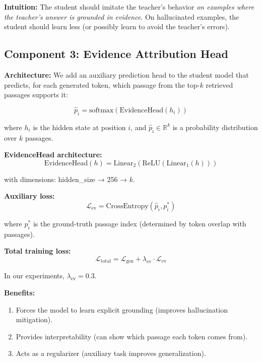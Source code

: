 \documentclass[11pt,a4paper]{article}
\begin{document}
\textbf{Intuition:} The student should imitate the teacher's behavior \textit{on examples where the teacher's answer is grounded in evidence}. On hallucinated examples, the student should learn less (or possibly learn to avoid the teacher's errors).

\subsection{Component 3: Evidence Attribution Head}
\label{sec:evidence}

\textbf{Architecture:} We add an auxiliary prediction head to the student model that predicts, for each generated token, which passage from the top-$k$ retrieved passages supports it:

\begin{equation}
\hat{p}_i = \text{softmax}(\text{EvidenceHead}(h_i))
\end{equation}

where $h_i$ is the hidden state at position $i$, and $\hat{p}_i \in \mathbb{R}^{k}$ is a probability distribution over $k$ passages.

\textbf{EvidenceHead architecture:}
\begin{equation}
\text{EvidenceHead}(h) = \text{Linear}_2(\text{ReLU}(\text{Linear}_1(h)))
\end{equation}

with dimensions: hidden\_size → 256 → $k$.

\textbf{Auxiliary loss:}
\begin{equation}
\mathcal{L}_{\text{ev}} = \text{CrossEntropy}(\hat{p}_i, p^*_i)
\end{equation}

where $p^*_i$ is the ground-truth passage index (determined by token overlap with passages).

\textbf{Total training loss:}
\begin{equation}
\mathcal{L}_{\text{total}} = \mathcal{L}_{\text{gen}} + \lambda_{\text{ev}} \cdot \mathcal{L}_{\text{ev}}
\end{equation}

In our experiments, $\lambda_{\text{ev}} = 0.3$.

\textbf{Benefits:}
\begin{enumerate}
    \item Forces the model to learn explicit grounding (improves hallucination mitigation).
    \item Provides interpretability (can show which passage each token comes from).
    \item Acts as a regularizer (auxiliary task improves generalization).
\end{enumerate}
\end{document}
